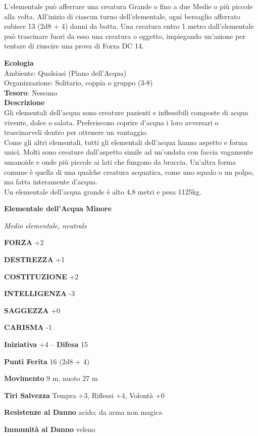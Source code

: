 \begin{multicols}{2}
L'elementale può afferrare una creatura Grande o fino a due Medie o più piccole alla volta. All'inizio di ciascun turno dell'elementale, ogni bersaglio afferrato subisce 13 (2d8 + 4) danni da botta. Una creatura entro 1 metro dall'elementale può trascinare fuori da esso una creatura o oggetto, impiegando un'azione per tentare di riuscire una prova di Forza DC 14.

\textbf{Ecologia}\\
Ambiente: Qualsiasi (Piano dell'Acqua)\\
Organizzazione: Solitario, coppia o gruppo (3-8)\\
\textbf{Tesoro}: Nessuno\\
\textbf{Descrizione}\\
Gli elementali dell'acqua sono creature pazienti e inflessibili composte di acqua vivente, dolce o salata. Preferiscono coprire d'acqua i loro avversari o trascinarveli dentro per ottenere un vantaggio.\\
Come gli altri elementali, tutti gli elementali dell'acqua hanno aspetto e forma unici. Molti sono creature dall'aspetto simile ad un'ondata con faccia vagamente umanoide e onde più piccole ai lati che fungono da braccia. Un'altra forma comune è quella di una qualche creatura acquatica, come uno squalo o un polpo, ma fatta interamente d'acqua.\\
Un elementale dell'acqua grande è alto 4,8 metri e pesa 1125kg.


\medskip{}\textbf{Elementale dell'Acqua Minore}

\textit{Medio elementale, neutrale}

\textbf{FORZA} +2

\textbf{DESTREZZA} +1

\textbf{COSTITUZIONE} +2

\textbf{INTELLIGENZA} -3

\textbf{SAGGEZZA} +0

\textbf{CARISMA} -1

\textbf{Iniziativa} +4 -- \textbf{Difesa} 15

\textbf{Punti Ferita} 16 (2d8 + 4)

\textbf{Movimento} 9 m, nuoto 27 m

\textbf{Tiri Salvezza} Tempra +3, Riflessi +4, Volontà +0

\textbf{Resistenze al Danno} acido; da arma non magica

\textbf{Immunità al Danno} veleno


\end{multicols}
